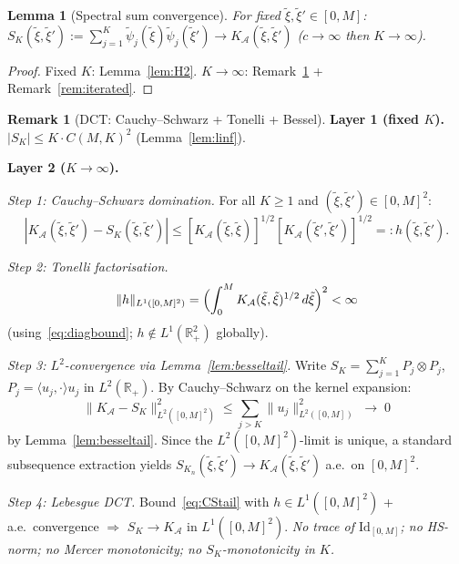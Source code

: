 \documentclass[12pt,a4paper]{amsart}
\newtheorem{lemma}[theorem]{Lemma}
\theoremstyle{definition}
\newtheorem{remark}[theorem]{Remark}
\newcommand{\cA}{\mathcal{A}}
\newcommand{\R}{\mathbb{R}}
\newcommand{\cKA}{K_{\cA}}
\newcommand{\xit}{\tilde{\xi}}
\newcommand{\normh}[2]{\|#1\|_{#2}}
\newcommand{\SK}{S_K}
\begin{document}
\begin{lemma}[Spectral sum convergence]
\label{lem:domconv}
For fixed $\xit,\xit'\in[0,M]$:
$\SK(\xit,\xit'):=\sum_{j=1}^K\tilde\psi_j(\xit)\tilde\psi_j(\xit')
\to\cKA(\xit,\xit')$
($c\to\infty$ then $K\to\infty$).
\end{lemma}
\begin{proof}
Fixed $K$: Lemma~\ref{lem:H2}.
$K\to\infty$: Remark~\ref{rem:dct} + Remark~\ref{rem:iterated}.
\end{proof}

\begin{remark}[DCT: Cauchy--Schwarz + Tonelli + Bessel]
\label{rem:dct}
\textbf{Layer 1 (fixed $K$).}
$|\SK|\leq K\cdot C(M,K)^2$ (Lemma~\ref{lem:linf}).

\medskip
\textbf{Layer 2 ($K\to\infty$).}

\textit{Step 1: Cauchy--Schwarz domination.}
For all $K\geq 1$ and $(\xit,\xit')\in[0,M]^2$:
\begin{equation}\label{eq:CStail}
  |\cKA(\xit,\xit')-\SK(\xit,\xit')|
  \leq
  [\cKA(\xit,\xit)]^{1/2}
  [\cKA(\xit',\xit')]^{1/2}
  =: h(\xit,\xit').
\end{equation}

\textit{Step 2: Tonelli factorisation.}
\begin{equation}\label{eq:Tonelli}
  \normh{h}{L^1([0,M]^2)}
  = \Bigl(\int_0^M\cKA(\xit,\xit)^{1/2}\,d\xit\Bigr)^2
  < \infty
\end{equation}
(using~\eqref{eq:diagbound}; $h\notin L^1(\R_+^2)$ globally).

\textit{Step 3: $L^2$-convergence via Lemma~\ref{lem:besseltail}.}
Write $\SK=\sum_{j=1}^K P_j\otimes P_j$,
$P_j=\langle u_j,\cdot\rangle u_j$ in $L^2(\R_+)$.
By Cauchy--Schwarz on the kernel expansion:
\begin{equation}\label{eq:L2conv}
  \normh{\cKA-\SK}{L^2([0,M]^2)}^2
  \leq \sum_{j>K}\normh{u_j}{L^2([0,M])}^2
  \;\to\; 0
\end{equation}
by Lemma~\ref{lem:besseltail}.
Since the $L^2([0,M]^2)$-limit is unique,
a standard subsequence extraction yields
$\SK_n(\xit,\xit')\to\cKA(\xit,\xit')$
a.e.\ on $[0,M]^2$.

\textit{Step 4: Lebesgue DCT.}
Bound~\eqref{eq:CStail} with $h\in L^1([0,M]^2)$
+ a.e.\ convergence $\Rightarrow$ $\SK\to\cKA$ in $L^1([0,M]^2)$.
\emph{No trace of $\mathrm{Id}_{[0,M]}$;
no HS-norm;
no Mercer monotonicity;
no $S_K$-monotonicity in $K$.}
\end{remark}

\end{document}
